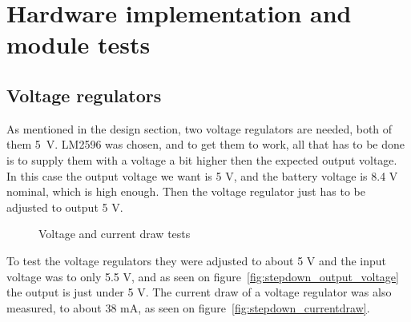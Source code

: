 \section{Hardware implementation and module tests}
\subsection{Voltage regulators}
As mentioned in the design section, two voltage regulators are needed, both of them 5~V.
LM2596 was chosen, and to get them to work, all that has to be done is to supply them with a voltage a bit higher then the expected output voltage. In this case the output voltage we want is 5 V, and the battery voltage is 8.4 V nominal, which is high enough. Then the voltage regulator just has to be adjusted to output 5 V. 

\begin{figure}[H]
	\centering
	\hfill
	\hfill
	\caption{Voltage and current draw tests}
\end{figure}

To test the voltage regulators they were adjusted to about 5 V and the input voltage was to only 5.5 V, and as seen on figure~\ref{fig:stepdown_output_voltage} the output is just under 5 V.  The current draw of a voltage regulator was also measured, to about 38 mA, as seen on figure~\ref{fig:stepdown_currentdraw}.

